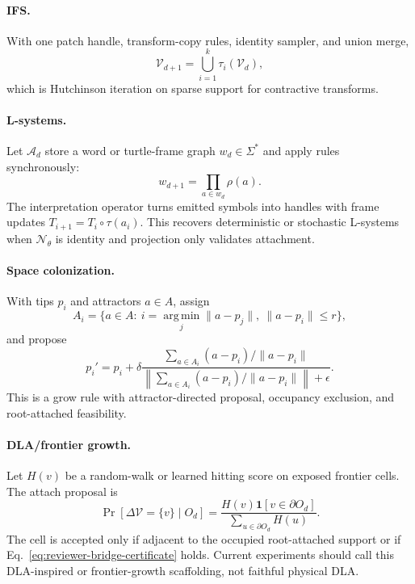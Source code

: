 \paragraph{IFS.}
With one patch handle, transform-copy rules, identity sampler, and union merge,
\begin{equation}
  \mathcal V_{d+1}=\bigcup_{i=1}^{k}\tau_i(\mathcal V_d),
\end{equation}
which is Hutchinson iteration on sparse support for contractive transforms.

\paragraph{L-systems.}
Let $\mathcal A_d$ store a word or turtle-frame graph $w_d\in\Sigma^\ast$ and
apply rules synchronously:
\begin{equation}
  w_{d+1}=\prod_{a\in w_d}\rho(a).
\end{equation}
The interpretation operator turns emitted symbols into handles with frame
updates $T_{i+1}=T_i\circ\tau(a_i)$. This recovers deterministic or stochastic
L-systems when $\mathcal N_\theta$ is identity and projection only validates
attachment.

\paragraph{Space colonization.}
With tips $p_i$ and attractors $a\in A$, assign
\begin{equation}
  A_i=\{a\in A:\ i=\operatorname*{arg\,min}_j\|a-p_j\|,
  \ \|a-p_i\|\le r\},
\end{equation}
and propose
\begin{equation}
  p_i'=p_i+\delta
  \frac{\sum_{a\in A_i}(a-p_i)/\|a-p_i\|}
  {\left\|\sum_{a\in A_i}(a-p_i)/\|a-p_i\|\right\|+\epsilon}.
\end{equation}
This is a grow rule with attractor-directed proposal, occupancy exclusion, and
root-attached feasibility.

\paragraph{DLA/frontier growth.}
Let $H(v)$ be a random-walk or learned hitting score on exposed frontier cells.
The attach proposal is
\begin{equation}
  \Pr[\Delta\mathcal V=\{v\}\mid O_d]
  =
  \frac{H(v)\mathbf 1[v\in\partial O_d]}
  {\sum_{u\in\partial O_d}H(u)}.
\end{equation}
The cell is accepted only if adjacent to the occupied root-attached support or
if Eq.~\eqref{eq:reviewer-bridge-certificate} holds. Current experiments should
call this DLA-inspired or frontier-growth scaffolding, not faithful physical DLA.


